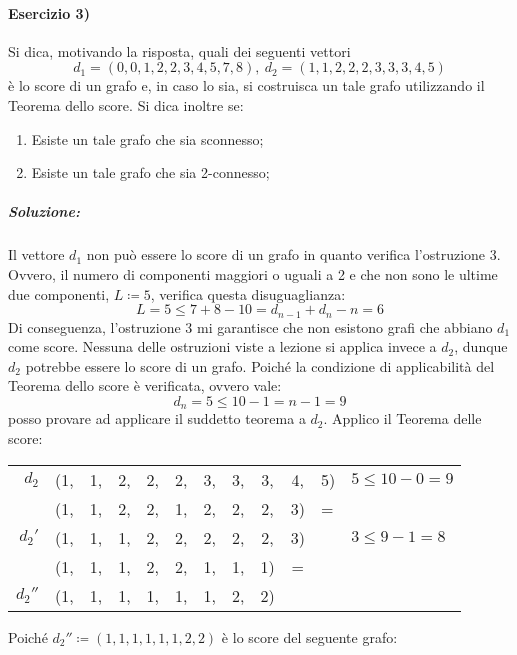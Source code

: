 \documentclass[12pt, a4paper]{report}
\theoremstyle{definition}
\begin{document}
\paragraph{Esercizio 3)}
Si dica, motivando la risposta, quali dei seguenti vettori
\[d_1=(0,0,1,2,2,3,4,5,7,8),\ d_2=(1,1,2,2,2,3,3,3,4,5)\]
è lo score di un grafo e, in caso lo sia, si costruisca un tale grafo utilizzando
il Teorema dello score. Si dica inoltre se:
\begin{enumerate}[label=(3\alph*)]
    \item Esiste un tale grafo che sia sconnesso;
    \item Esiste un tale grafo che sia 2-connesso;
\end{enumerate}
\subparagraph{Soluzione:}
Il vettore $d_1$ non può essere lo score di un grafo in quanto verifica
l'ostruzione 3. Ovvero, il numero di componenti maggiori o uguali a 2 e che non
sono le ultime due componenti, $L\coloneqq5$, verifica questa disuguaglianza:
\[L=5\leq7+8-10=d_{n-1}+d_n-n=6\]
Di conseguenza, l'ostruzione 3 mi garantisce che non esistono grafi che abbiano
$d_1$ come score. Nessuna delle ostruzioni viste a lezione si applica invece a
$d_2$, dunque $d_2$ potrebbe essere lo score di un grafo. Poiché la condizione di
applicabilità del Teorema dello score è verificata, ovvero vale:
\[d_n=5\leq10-1=n-1=9\]
posso provare ad applicare il suddetto teorema a $d_2$.
\newpage\noindent
Applico il Teorema delle score:
\begin{center}
    \begin{tabular}{r|cccccccccl|l}
        $d_2$ &(1, &1, &2, &2, &2, &3, &3, &3, &4, &5) &$5\leq10-0=9$\\
              & (1, &1, &2, &2, &1, &2, &2, &2, &3)&=  &\\
        $d_2'$ & (1, &1, &1, &2, &2, &2, &2, &2, &3) & & $3\leq9-1=8$\\
               & (1, &1, &1, &2, &2, &1, &1, &1) &=   & &\\
        $d_2''$ & (1, &1, &1, &1, &1, &1, &2, &2) & & & 
    \end{tabular}
\end{center}
Poiché $d_2''\coloneqq(1,1,1,1,1,1,2,2)$ è lo score del seguente grafo:
\begin{center}
\end{center}
\end{document}
